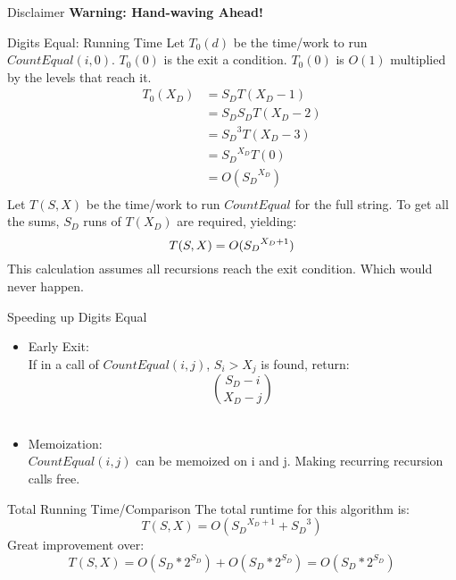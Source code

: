 \documentclass[10pt]{beamer}
\begin{document}
\begin{frame}{Disclaimer}
  \Huge \textbf{Warning: Hand-waving Ahead!}
\end{frame}

\begin{frame}{Digits Equal: Running Time}
  Let $T_{0}(d)$ be the time/work to run $CountEqual(i, 0)$.
  $T_{0}(0)$ is the exit a condition.
  $T_{0}(0)$ is $O(1)$ multiplied by the levels that reach it. \\
  \begin{align*}
    T_{0}(X_{D}) &= S_{D}T(X_{D} - 1) \\
         &= S_{D}S_{D}T(X_{D} - 2) \\
         &= {S_{D}}^{3}T(X_{D} - 3) \\
         &= {S_{D}}^{X_{D}}T(0) \\
         &= O({S_{D}}^{X_{D}}) \\
  \end{align*}
  Let $T(S, X)$ be the time/work to run $CountEqual$ for the full string.
  To get all the sums, $S_{D}$ runs of $T(X_{D})$ are required, yielding:
  \begin{equation*}
    T(S, X) = O({S_{D}}^{X_{D} + 1}) \\
  \end{equation*}
  This calculation assumes all recursions reach the exit condition.
  Which would never happen.
\end{frame}

\begin{frame}{Speeding up Digits Equal}
  \begin{itemize}
    \item Early Exit: \\
      If in a call of $CountEqual(i, j)$, $S_{i} > X_{j}$ is found, return:\\
      \begin{equation*}
        \binom{S_{D} - i}{X_{D} - j}
      \end{equation*}\\
    \item Memoization: \\
      $CountEqual(i, j)$ can be memoized on i and j.
      Making recurring recursion calls free.
  \end{itemize}
\end{frame}

\begin{frame}{Total Running Time/Comparison}
  The total runtime for this algorithm is:
  \begin{equation*}
    T(S, X) = O({S_{D}}^{X_{D} + 1} + {S_{D}}^{3})
  \end{equation*}
  Great improvement over:
  \begin{equation*}
    T(S, X) = O(S_{D}*2^{S_{D}}) + O(S_{D}*2^{S_{D}}) = O(S_{D}*2^{S_{D}})
  \end{equation*}
\end{frame}
\end{document}
